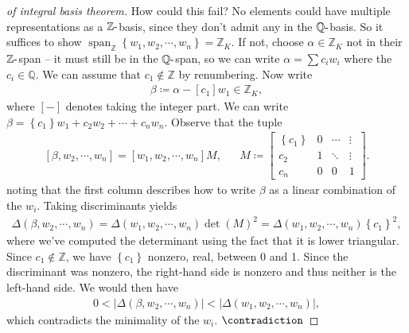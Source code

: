 \begin{proof}[of integral basis theorem]
How could this fail? No elements could have multiple representations as
a \({\mathbb{Z}}{\hbox{-}}\)basis, since they don't admit any in the
\({\mathbb{Q}}{\hbox{-}}\)basis. So it suffices to show
\({\operatorname{span}}_{\mathbb{Z}}\left\{{ { {w}_1, {w}_2, \cdots, {w}_{n}} }\right\} = {\mathbb{Z}}_K\).
If not, choose \(\alpha\in {\mathbb{Z}}_K\) not in their
\({\mathbb{Z}}{\hbox{-}}\)span -- it must still be in the
\({\mathbb{Q}}{\hbox{-}}\)span, so we can write \(\alpha= \sum c_i w_i\)
where the \(c_i\in {\mathbb{Q}}\). We can assume that
\(c_1\not \in {\mathbb{Z}}\) by renumbering. Now write
\begin{align*}
\beta \coloneqq\alpha - \left[ {c_1}\right]  w_1 \in {\mathbb{Z}}_K
,\end{align*}
where \(\left[ {{-}}\right]\) denotes taking the integer part. We can
write \(\beta = \left\{{c_1}\right\}w_1 + c_2 w_2 + \cdots + c_n w_n\).
Observe that the tuple
\begin{align*}
{\left[ { \beta, w_2, \cdots, w_n} \right]} 
= {\left[ { w_1 , w_2, \cdots, w_n} \right]} 
M,
&& 
M \coloneqq
\begin{bmatrix}
\left\{{c_1}\right\} & 0  & \cdots & \vdots \\
c_2 &  1 & \ddots & \vdots \\
c_n &  0 & 0 & 1
\end{bmatrix}
.\end{align*}
noting that the first column describes how to write \(\beta\) as a
linear combination of the \(w_i\). Taking discriminants yields
\begin{align*}
{\Delta}(\beta, w_2, \cdots, w_n) 
= {\Delta}( { {w}_1, {w}_2, \cdots, {w}_{n}} )\det(M)^2
= {\Delta}( { {w}_1, {w}_2, \cdots, {w}_{n}} )\left\{{c_1}\right\}^2
,\end{align*}
where we've computed the determinant using the fact that it is lower
triangular. Since \(c_1\not\in{\mathbb{Z}}\), we have
\(\left\{{c_1}\right\}\) nonzero, real, between 0 and 1. Since the
discriminant was nonzero, the right-hand side is nonzero and thus
neither is the left-hand side. We would then have
\begin{align*}
0 < 
{\left\lvert { {\Delta}( \beta, w_2, \cdots, w_n) } \right\rvert}
<
{\left\lvert { {\Delta}( { {w}_1, {w}_2, \cdots, {w}_{n}} ) } \right\rvert}
,\end{align*}
which contradicts the minimality of the \(w_i\). \(\contradiction\)

\end{proof}

